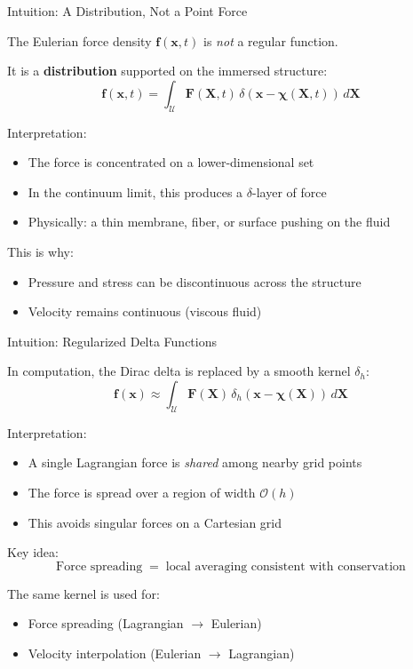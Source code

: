 \documentclass{beamer}
\begin{document}
\begin{frame}{Intuition: A Distribution, Not a Point Force}

The Eulerian force density $\mathbf{f}(\mathbf{x},t)$ is \emph{not} a regular function.

\medskip

It is a \textbf{distribution} supported on the immersed structure:
\[
\mathbf{f}(\mathbf{x},t)
=
\int_{\mathcal{U}}
\mathbf{F}(\mathbf{X},t)\,
\delta(\mathbf{x}-\boldsymbol{\chi}(\mathbf{X},t))\,d\mathbf{X}
\]

\medskip

Interpretation:
\begin{itemize}
    \item The force is concentrated on a lower-dimensional set
    \item In the continuum limit, this produces a $\delta$-layer of force
    \item Physically: a thin membrane, fiber, or surface pushing on the fluid
\end{itemize}

\medskip

This is why:
\begin{itemize}
    \item Pressure and stress can be discontinuous across the structure
    \item Velocity remains continuous (viscous fluid)
\end{itemize}

\end{frame}


\begin{frame}{Intuition: Regularized Delta Functions}

In computation, the Dirac delta is replaced by a smooth kernel $\delta_h$:
\[
\mathbf{f}(\mathbf{x})
\approx
\int_{\mathcal{U}}
\mathbf{F}(\mathbf{X})\,
\delta_h(\mathbf{x}-\boldsymbol{\chi}(\mathbf{X}))\,d\mathbf{X}
\]

\medskip

Interpretation:
\begin{itemize}
    \item A single Lagrangian force is \emph{shared} among nearby grid points
    \item The force is spread over a region of width $\mathcal{O}(h)$
    \item This avoids singular forces on a Cartesian grid
\end{itemize}

\medskip

Key idea:
\[
\text{Force spreading} \;\;=\;\; \text{local averaging consistent with conservation}
\]

\medskip

The same kernel is used for:
\begin{itemize}
    \item Force spreading (Lagrangian $\rightarrow$ Eulerian)
    \item Velocity interpolation (Eulerian $\rightarrow$ Lagrangian)
\end{itemize}

\end{frame}
\end{document}
